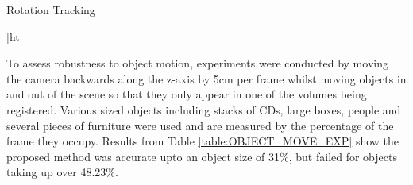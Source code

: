 \begin{table}[ht]
\parbox{.45\linewidth}{
\centering
{}
\caption{Rotation Tracking}
\label{table:rote}
}
\hfill
\parbox{.45\linewidth}{
\centering
{}
\caption{Object Motion Test}
\label{table:OBJECT_MOVE_EXP}
}
\end{table}[ht]


To assess robustness to object motion, experiments were conducted by moving the camera backwards along the z-axis by 5cm per frame whilst moving objects in and out of the scene so that they only appear in one of the volumes being registered. Various sized objects including stacks of CDs, large boxes, people and several pieces of furniture were used and are measured by the percentage of the frame they occupy. Results from Table \ref{table:OBJECT_MOVE_EXP} show the proposed method was accurate upto an object size of 31\%, but failed for objects taking up over 48.23\%.

